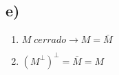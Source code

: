 \subsection*{e)}

\begin{enumerate}
	\item $M \; cerrado \to M = \bar{M}$
	\item $(M^\perp)^\perp = \bar{M} = M$
\end{enumerate}
